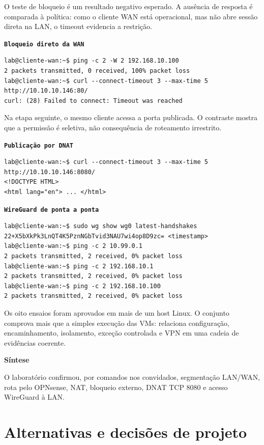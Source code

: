 \documentclass[12pt,a4paper]{article}
\newenvironment{resultado}[1][]{\par\medskip\noindent
 \begin{minipage}{\textwidth}\color{verdeforte}\textbf{#1}\par\color{black}}
 {\end{minipage}\par\medskip}
\newenvironment{terminalbox}[1][]{\par\medskip\noindent
 \textbf{\texttt{#1}}\par\nobreak}{\par\medskip}
\begin{document}
O teste de bloqueio é um resultado negativo esperado. A ausência de resposta é
comparada à política: como o cliente WAN está operacional, mas não abre sessão
direta na LAN, o timeout evidencia a restrição.
\begin{terminalbox}[Bloqueio direto da WAN]
\begin{lstlisting}[style=terminal]
lab@cliente-wan:~$ ping -c 2 -W 2 192.168.10.100
2 packets transmitted, 0 received, 100% packet loss
lab@cliente-wan:~$ curl --connect-timeout 3 --max-time 5 http://10.10.10.146:80/
curl: (28) Failed to connect: Timeout was reached
\end{lstlisting}\end{terminalbox}

Na etapa seguinte, o mesmo cliente acessa a porta publicada. O contraste mostra
que a permissão é seletiva, não consequência de roteamento irrestrito.
\begin{terminalbox}[Publicação por DNAT]
\begin{lstlisting}[style=terminal]
lab@cliente-wan:~$ curl --connect-timeout 3 --max-time 5 http://10.10.10.146:8080/
<!DOCTYPE HTML>
<html lang="en"> ... </html>
\end{lstlisting}\end{terminalbox}

\begin{terminalbox}[WireGuard de ponta a ponta]
\begin{lstlisting}[style=terminal]
lab@cliente-wan:~$ sudo wg show wg0 latest-handshakes
22+X5bXkPk3LnQT4K5PznNGbTvid3NAU7wi4op8D9zc= <timestamp>
lab@cliente-wan:~$ ping -c 2 10.99.0.1
2 packets transmitted, 2 received, 0% packet loss
lab@cliente-wan:~$ ping -c 2 192.168.10.1
2 packets transmitted, 2 received, 0% packet loss
lab@cliente-wan:~$ ping -c 2 192.168.10.100
2 packets transmitted, 2 received, 0% packet loss
\end{lstlisting}\end{terminalbox}

Os oito ensaios foram aprovados em mais de um host Linux. O conjunto comprova
mais que a simples execução das VMs: relaciona configuração, encaminhamento,
isolamento, exceção controlada e VPN em uma cadeia de evidências coerente.
\begin{resultado}[Síntese]
O laboratório confirmou, por comandos nos convidados, segmentação LAN/WAN,
rota pelo OPNsense, NAT, bloqueio externo, DNAT TCP 8080 e acesso WireGuard à LAN.
\end{resultado}

\section{Alternativas e decisões de projeto}
\end{document}

